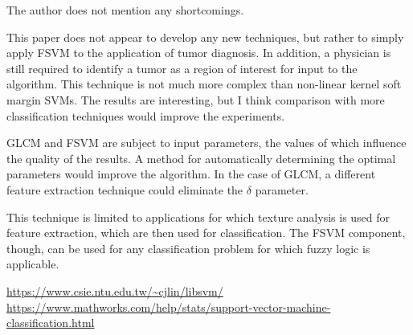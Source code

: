 \documentclass[11pt]{article}
\begin{document}
\begin{description}[leftmargin=0in]
    \item [Shortcomings] The author does not mention any shortcomings.

    \item [Self Evaluation] This paper does not appear to develop any new
        techniques, but rather to simply apply FSVM to the application of tumor
        diagnosis. In addition, a physician is still required to identify a
        tumor as a region of interest for input to the algorithm. This technique
        is not much more complex than non-linear kernel soft margin SVMs. The
        results are interesting, but I think comparison with more classification
        techniques would improve the experiments.

    \item [Improvements] GLCM and FSVM are subject to input parameters, the
        values of which influence the quality of the results. A method for
        automatically determining the optimal parameters would improve the
        algorithm. In the case of GLCM, a different feature extraction technique
        could eliminate the $\delta$ parameter.

    \item [Applications] This technique is limited to applications for which
        texture analysis is used for feature extraction, which are then used for
        classification. The FSVM component, though, can be used for any
        classification problem for which fuzzy logic is applicable.

    \item [Packages] \url{https://www.csie.ntu.edu.tw/~cjlin/libsvm/} \\
        \url{https://www.mathworks.com/help/stats/support-vector-machine-classification.html}
\end{description}

 
\end{document}
